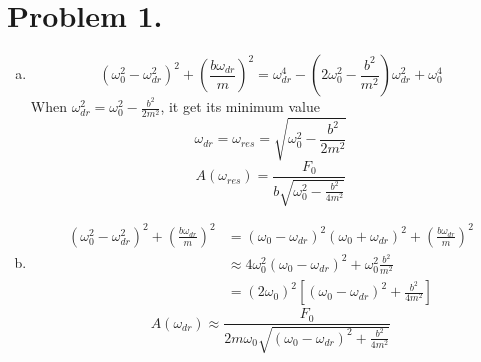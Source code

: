 \documentclass{article}
\begin{document}
\section*{Problem 1.}
	\begin{enumerate}[(a)]
	\item
	$$(\omega_0^2-\omega_{dr}^2)^2+\left(\frac{b\omega_{dr}}{m}\right)^2=\omega_{dr}^4-\left(2\omega_0^2-\frac{b^2}{m^2}\right)\omega_{dr}^2+\omega_0^4$$
	When $\omega_{dr}^2=\omega_0^2-\frac{b^2}{2m^2}$, it get its minimum value
	$$\omega_{dr}=\omega_{res}=\sqrt{\omega_0^2-\frac{b^2}{2m^2}}$$
	$$A(\omega_{res})=\frac{F_0}{b\sqrt{\omega_0^2-\frac{b^2}{4m^2}}}$$
	\item
	\begin{align*}
	(\omega_0^2-\omega_{dr}^2)^2+\left(\frac{b\omega_{dr}}{m}\right)^2&=(\omega_0-\omega_{dr})^2(\omega_0+\omega_{dr})^2+\left(\frac{b\omega_{dr}}{m}\right)^2\\
	&\approx 4\omega_0^2(\omega_0-\omega_{dr})^2+\omega_0^2\frac{b^2}{m^2}\\
	&=(2\omega_0)^2\left[(\omega_0-\omega_{dr})^2+\frac{b^2}{4m^2}\right]
	\end{align*}
	$$A(\omega_{dr})\approx \frac{F_0}{2m\omega_0\sqrt{(\omega_0-\omega_{dr})^2+\frac{b^2}{4m^2}}}$$
	\begin{figure}[h!]
		\centering				

\end{figure}
\end{enumerate}
\end{document}
